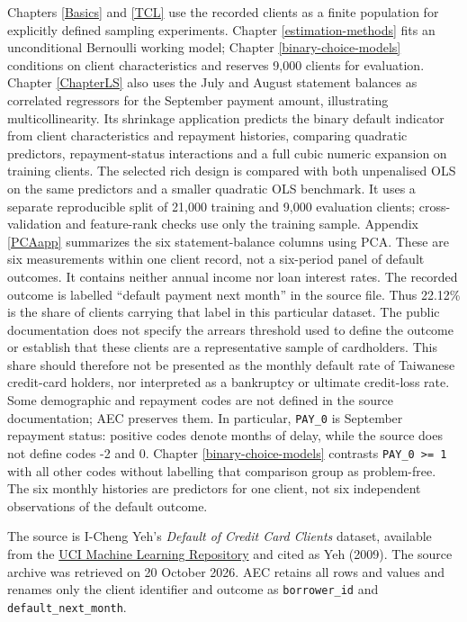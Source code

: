 \documentclass[
  11pt,
]{book}
\theoremstyle{definition}
\theoremstyle{definition}
\theoremstyle{definition}
\theoremstyle{definition}
\theoremstyle{remark}
\begin{document}
Chapters \ref{Basics} and \ref{TCL} use the recorded clients as a finite population for explicitly defined sampling experiments. Chapter \ref{estimation-methods} fits an unconditional Bernoulli working model; Chapter \ref{binary-choice-models} conditions on client characteristics and reserves 9,000 clients for evaluation. Chapter \ref{ChapterLS} also uses the July and August statement balances as correlated regressors for the September payment amount, illustrating multicollinearity. Its shrinkage application predicts the binary default indicator from client characteristics and repayment histories, comparing quadratic predictors, repayment-status interactions and a full cubic numeric expansion on training clients. The selected rich design is compared with both unpenalised OLS on the same predictors and a smaller quadratic OLS benchmark. It uses a separate reproducible split of 21,000 training and 9,000 evaluation clients; cross-validation and feature-rank checks use only the training sample. Appendix \ref{PCAapp} summarizes the six statement-balance columns using PCA. These are six measurements within one client record, not a six-period panel of default outcomes. It contains neither annual income nor loan interest rates. The recorded outcome is labelled ``default payment next month'' in the source file. Thus 22.12\% is the share of clients carrying that label in this particular dataset. The public documentation does not specify the arrears threshold used to define the outcome or establish that these clients are a representative sample of cardholders. This share should therefore not be presented as the monthly default rate of Taiwanese credit-card holders, nor interpreted as a bankruptcy or ultimate credit-loss rate. Some demographic and repayment codes are not defined in the source documentation; AEC preserves them. In particular, \texttt{PAY\_0} is September repayment status: positive codes denote months of delay, while the source does not define codes -2 and 0. Chapter \ref{binary-choice-models} contrasts \texttt{PAY\_0\ \textgreater{}=\ 1} with all other codes without labelling that comparison group as problem-free. The six monthly histories are predictors for one client, not six independent observations of the default outcome.

The source is I-Cheng Yeh's \emph{Default of Credit Card Clients} dataset, available from the \href{https://doi.org/10.24432/C55S3H}{UCI Machine Learning Repository} and cited as Yeh (2009). The source archive was retrieved on 20 October 2026. AEC retains all rows and values and renames only the client identifier and outcome as \texttt{borrower\_id} and \texttt{default\_next\_month}.
\end{document}
